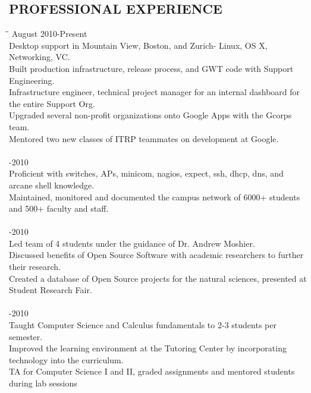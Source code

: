 \documentclass{res}
\begin{document}
\begin{resume}
\section{PROFESSIONAL EXPERIENCE}
  \vspace{-5pt}
  \begin{tabbing}
  \hspace{2.5in}\= \hspace{3.45in}\= \kill %
  \hspace{-0.25in}{\bf Internal Technology Resident, Google } \> \> \hspace{-0.65in}August 2010-Present\\
    Desktop support in Mountain View, Boston, and Zurich- Linux, OS X, Networking, VC.\\
    Built production infrastructure, release process, and GWT code with Support Engineering.\\
    Infrastructure engineer, technical project manager for an internal dashboard for the entire Support Org.\\
    Upgraded several non-profit organizations onto Google Apps with the Gcorps team.\\
    Mentored two new classes of ITRP teammates on development at Google.\\
\\
  \hspace{-0.25in}{\bf Student Network + Systems Admin, Chapman University IS\&T} \> -2010\\
    Proficient with switches, APs, minicom, nagios, expect, ssh, dhcp, dns, and arcane shell knowledge.\\
    Maintained, monitored and documented the campus network of 6000+ students and 500+ faculty and staff.\\
\\
  \hspace{-0.25in}{\bf Student Researcher, Chapman University CS Department} \>    -2010\\
    Led team of 4 students under the guidance of Dr. Andrew Moshier.\\
    Discussed benefits of Open Source Software with academic researchers to further their research.\\
    Created a database of Open Source projects for the natural sciences, presented at Student Research Fair. \\
\\
  \hspace{-0.25in}{\bf Tutor and Teaching Assistant, Chapman University Center for Academic Success} \> -2010\\
    Taught Computer Science and Calculus fundamentals to 2-3 students per semester.\\
    Improved the learning environment at the Tutoring Center by incorporating technology into the curriculum.\\
    TA for Computer Science I and II, graded assignments and mentored students during lab sessions\\
  \end{tabbing}
  \vspace{-0.4in}


\end{resume}
\end{document}
